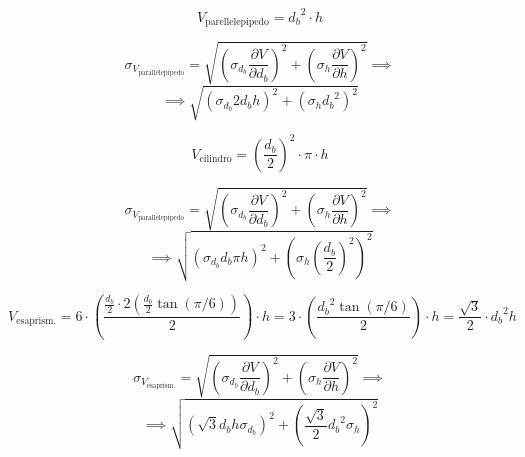\documentclass[8pt]{article}
\begin{document}
\begin{displaymath}
	V_{\text{parellelepipedo}} = {d_b}^2 \cdot h
\end{displaymath}

\begin{displaymath}
\sigma_{V_{\text{parallelepipedo}}} = \sqrt{\left(\sigma_{d_b}\frac{\partial V}{\partial d_b}\right)^2 + \left(\sigma_{h}\frac{\partial V}{\partial h}\right)^2}
\implies
\end{displaymath}
\begin{displaymath}
\implies \sqrt{\left(\sigma_{d_b}2d_{b}h\right)^2 + \left(\sigma_{h}{d_b}^2\right)^2}
\end{displaymath}

\smallskip

\begin{displaymath}
	V_{\text{cilindro}} = {\left(\frac{d_b}{2}\right)}^2 \cdot \pi \cdot h
\end{displaymath}

\begin{displaymath}
\sigma_{V_{\text{parallelepipedo}}} = \sqrt{\left(\sigma_{d_b}\frac{\partial V}{\partial d_b}\right)^2 + \left(\sigma_{h}\frac{\partial V}{\partial h}\right)^2}
\implies
\end{displaymath}
\begin{displaymath}
\implies \sqrt{\left(\sigma_{d_b}d_{b} \pi h\right)^2 + \left(\sigma_{h}{\left(\frac{d_b}{2}\right)}^2\right)^2}
\end{displaymath}

\smallskip

\begin{displaymath}
	V_{\text{esaprism.}} = 6 \cdot \left(\frac{\frac{d_b}{2} \cdot 2\left(\frac{d_b}{2} \tan(\pi / 6)\right)}{2}\right) \cdot h = 3 \cdot \left(\frac{{d_b}^2 \tan(\pi / 6)}{2}\right) \cdot h = \frac{\sqrt{3}}{2} \cdot {d_b}^2 h
\end{displaymath}

\begin{displaymath}
\sigma_{V_{\text{esaprism.}}} = \sqrt{\left(\sigma_{d_b}\frac{\partial V}{\partial d_b}\right)^2 + \left(\sigma_{h}\frac{\partial V}{\partial h}\right)^2}
\implies
\end{displaymath}
\begin{displaymath}
\implies \sqrt{\left(\sqrt{3} d_b h \sigma_{d_b}\right)^2 + \left(\frac{\sqrt{3}}{2} {d_b}^2 \sigma_{h}\right)^2}
\end{displaymath}
\end{document}
